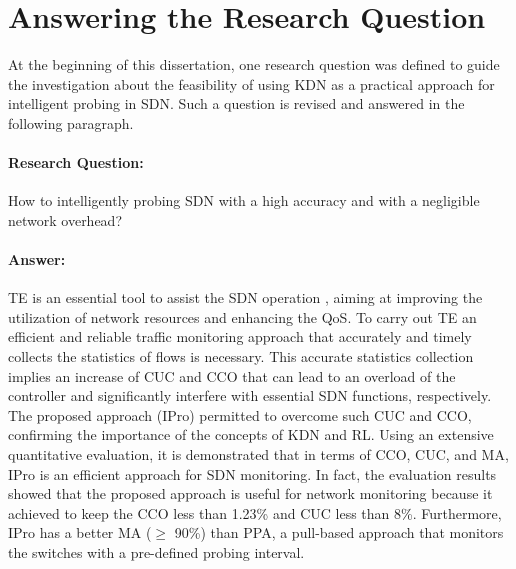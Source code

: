 \section{Answering the Research Question}
\label{sec:answer_question}

At the beginning of this dissertation, one research question was defined to guide the investigation about the feasibility of using KDN as a practical approach for intelligent probing in SDN. Such a question is revised and answered in the following paragraph.\\

\paragraph{\textbf{Research Question:}} How to intelligently probing SDN with a high accuracy and with a negligible network overhead?\\

\paragraph{\textbf{Answer:}} TE is an essential tool to assist the SDN operation \cite{ian_2014:a_road_map_sdn}, aiming at improving the utilization of network resources and enhancing the QoS. To carry out TE an efficient and reliable traffic monitoring approach that accurately and timely collects the statistics of flows is necessary. This accurate statistics collection implies an increase of CUC and CCO that can lead to an overload of the controller and significantly interfere with essential SDN functions, respectively. The proposed approach (IPro) permitted to overcome such CUC and CCO, confirming the importance of the concepts of KDN and RL. Using an extensive quantitative evaluation, it is demonstrated that in terms of CCO, CUC, and MA, IPro is an efficient approach for SDN monitoring. In fact, the evaluation results showed that the proposed approach is useful for network monitoring because it achieved to keep the CCO less than 1.23\% and CUC less than 8\%. Furthermore, IPro has a better MA ($\geq$ 90\%) than PPA, a pull-based approach that monitors the switches with a pre-defined probing interval.


